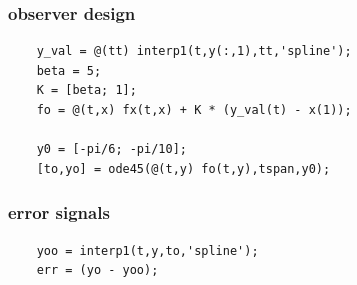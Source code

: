 \subsubsection*{observer design}
\begin{verbatim}
    y_val = @(tt) interp1(t,y(:,1),tt,'spline');
    beta = 5;
    K = [beta; 1];
    fo = @(t,x) fx(t,x) + K * (y_val(t) - x(1));
    
    y0 = [-pi/6; -pi/10];
    [to,yo] = ode45(@(t,y) fo(t,y),tspan,y0);
\end{verbatim}
    
\subsubsection*{error signals}    
\begin{verbatim}
    yoo = interp1(t,y,to,'spline');
    err = (yo - yoo);
\end{verbatim}